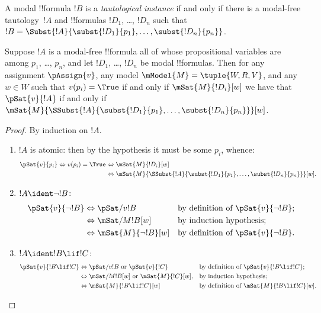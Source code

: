 \documentclass[../../../include/open-logic-section]{subfiles}
\begin{document}


\begin{defn}
  A modal !!{formula} $!B$ is a \emph{tautological instance} if and
  only if there is a modal-free tautology~$!A$ and !!{formula}s
  $!D_1$, \dots, $!D_n$ such that $!B = \Subst{!A}{\subst{!D_1}{p_1},
    \dots, \subst{!D_n}{p_n}}$.
\end{defn}

\begin{lem}
  Suppose $!A$ is a modal-free !!{formula} all of whose propositional
  variables are among $p_1$, \dots, $p_n$, and let $!D_1$, \dots,
  $!D_n$ be modal !!{formula}s. Then for any assignment $\pAssign{v}$,
  any model $\mModel{M} = \tuple{W, R, V}$, and any $w \in W$ such
  that $v(p_i) = \True$ if and only if $\mSat{M}{!D_i}[w]$ we have
  that $\pSat{v}{!A}$ if and only if
  $\mSat{M}{\SSubst{!A}{\subst{!D_1}{p_1}, \dots,
      \subst{!D_n}{p_n}}}[w]$.
\end{lem}

\begin{proof}
  By induction on $!A$.
  \begin{enumerate}
    \item $!A$ is atomic: then by the hypothesis it must be some
      $p_i$, whence:
      \begin{align*}
        \pSat{v}{p_i} \Leftrightarrow v(p_i) = \True 
        & \Leftrightarrow \mSat{M}{!D_i}[w] \\
        & \Leftrightarrow \mSat{M}{\SSubst{!A}{\subst{!D_1}{p_1}, \dots,
          \subst{!D_n}{p_n}}}[w].
      \end{align*}
    \item $!A \ident \lnot !B$:
      \begin{align*}
        \pSat{v}{\lnot !B} & \Leftrightarrow 
        \pSat/{v}{!B}
        && \text{by definition of $\pSat{v}{\lnot !B}$};\\
        & \Leftrightarrow  \mSat/{M}{!B}[w] && \text{by induction hypothesis};\\
        & \Leftrightarrow  \mSat{M}{\lnot !B}[w]
        && \text{by definition of $\pSat{v}{\lnot !B}$}.
      \end{align*}
    \item $!A \ident !B \lif !C$:
      \begin{align*}
        \pSat{v}{!B \lif !C} & \Leftrightarrow
        \pSat/{v}{!B} \text{ or } \pSat{v}{!C}
        && \text{by definition of $\pSat{v}{!B \lif !C}$};\\
        & \Leftrightarrow \mSat/{M}{!B}[w] \text{ or } \mSat{M}{!C}[w],
        && \text{by induction hypothesis}; \\
        & \Leftrightarrow \mSat{M}{!B \lif !C}[w]
        && \text{by definition of $\mSat{M}{!B \lif !C}[w]$}.\qedhere
      \end{align*}
  \end{enumerate}
  \end{proof}
\end{document}

